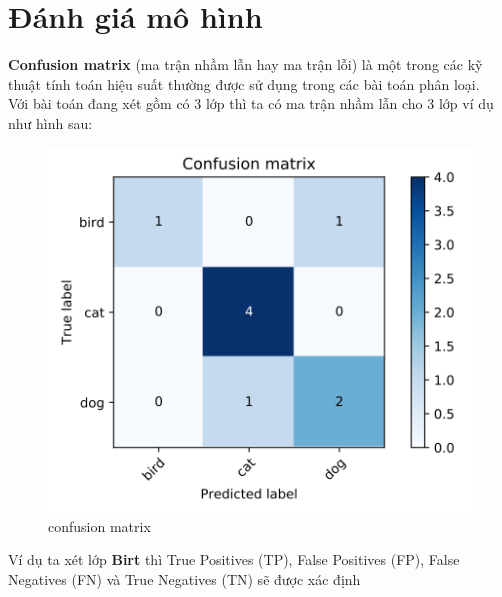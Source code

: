 \section{Đánh giá mô hình}
\textbf{Confusion matrix} (ma trận nhầm lẫn hay ma trận lỗi) là một trong các kỹ thuật tính toán hiệu suất thường được sử dụng trong các bài toán phân loại.\\

Với bài toán đang xét gồm có 3 lớp thì ta có ma trận nhầm lẫn cho 3 lớp ví dụ như hình sau:
\begin{center}
    \begin{figure}[!h]
        \centering
        \includegraphics[scale = 0.5]{fileanh/6.png}
        \caption{confusion matrix}
    \end{figure}
\end{center}
Ví dụ ta xét lớp \textbf{Birt} thì True Positives (TP), False Positives (FP), False Negatives (FN) và True Negatives (TN) sẽ được xác định
